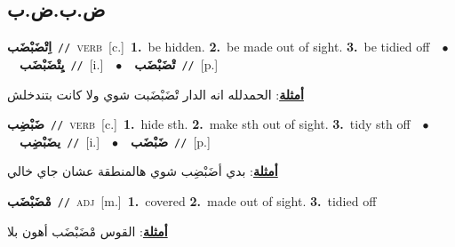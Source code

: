 \documentclass[10pt,a4paper,twoside]{article} %
\begin{document}
\begin{multicols}{2}
{{\vspace{-3mm}
\subsection*{\color{blue}\foreignlanguage{arabic}{ض.ب.ض.ب}\color{blue}{}} 

{\setlength\topsep{0pt}\textbf{\foreignlanguage{arabic}{اِتْضَبْضَب}}\ {\color{gray}\texttt{//}\color{black}}\ \textsc{verb}\ [c.]\ \textbf{1.}~be hidden.  \textbf{2.}~be made out of sight.  \textbf{3.}~be tidied off\ \ $\bullet$\ \ \setlength\topsep{0pt}\textbf{\foreignlanguage{arabic}{يِتْضَبْضَب}}\ {\color{gray}\texttt{//}\color{black}}\ [i.]\ \ $\bullet$\ \ \setlength\topsep{0pt}\textbf{\foreignlanguage{arabic}{تْضَبْضَب}}\ {\color{gray}\texttt{//}\color{black}}\ [p.]\  \begin{flushright}\color{gray}\foreignlanguage{arabic}{\textbf{\underline{\foreignlanguage{arabic}{أمثلة}}}: الحمدلله انه الدار تْضَبْضَبت شوي ولا كانت بتندخلش}\end{flushright}\color{black}} \vspace{2mm}

{\setlength\topsep{0pt}\textbf{\foreignlanguage{arabic}{ضَبْضِب}}\ {\color{gray}\texttt{//}\color{black}}\ \textsc{verb}\ [c.]\ \textbf{1.}~hide sth.  \textbf{2.}~make sth out of sight.  \textbf{3.}~tidy sth off\ \ $\bullet$\ \ \setlength\topsep{0pt}\textbf{\foreignlanguage{arabic}{يضَبْضِب}}\ {\color{gray}\texttt{//}\color{black}}\ [i.]\ \ $\bullet$\ \ \setlength\topsep{0pt}\textbf{\foreignlanguage{arabic}{ضَبْضَب}}\ {\color{gray}\texttt{//}\color{black}}\ [p.]\  \begin{flushright}\color{gray}\foreignlanguage{arabic}{\textbf{\underline{\foreignlanguage{arabic}{أمثلة}}}: بدي أضَبْضِب شوي هالمنطقة عشان جاي خالي}\end{flushright}\color{black}} \vspace{2mm}

{\setlength\topsep{0pt}\textbf{\foreignlanguage{arabic}{مْضَبْضَب}}\ {\color{gray}\texttt{//}\color{black}}\ \textsc{adj}\ [m.]\ \textbf{1.}~covered  \textbf{2.}~made out of sight.  \textbf{3.}~tidied off\  \begin{flushright}\color{gray}\foreignlanguage{arabic}{\textbf{\underline{\foreignlanguage{arabic}{أمثلة}}}: القوس مْضَبْضَب أهون بلا}\end{flushright}\color{black}} \vspace{2mm}

}}
\end{multicols}
\end{document}
